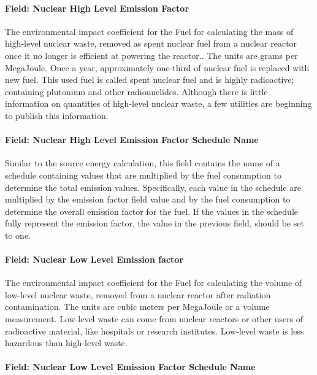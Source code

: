 \paragraph{Field: Nuclear High Level Emission Factor}\label{field-nuclear-high-level-emission-factor}

The environmental impact coefficient for the Fuel for calculating the mass of high-level nuclear waste, removed as spent nuclear fuel from a nuclear reactor once it no longer is efficient at powering the reactor.. The units are grams per MegaJoule. Once a year, approximately one-third of nuclear fuel is replaced with new fuel. This used fuel is called spent nuclear fuel and is highly radioactive; containing plutonium and other radionuclides. Although there is little information on quantities of high-level nuclear waste, a few utilities are beginning to publish this information.

\paragraph{Field: Nuclear High Level Emission Factor Schedule Name}\label{field-nuclear-high-level-emission-factor-schedule-name}

Similar to the source energy calculation, this field contains the name of a schedule containing values that are multiplied by the fuel consumption to determine the total emission values. Specifically, each value in the schedule are multiplied by the emission factor field value and by the fuel consumption to determine the overall emission factor for the fuel. If the values in the schedule fully represent the emission factor, the value in the previous field, should be set to one.

\paragraph{Field: Nuclear Low Level Emission factor}\label{field-nuclear-low-level-emission-factor}

The environmental impact coefficient for the Fuel for calculating the volume of low-level nuclear waste, removed from a nuclear reactor after radiation contamination. The units are cubic meters per MegaJoule or a volume measurement. Low-level waste can come from nuclear reactors or other users of radioactive material, like hospitals or research institutes. Low-level waste is less hazardous than high-level waste.

\paragraph{Field: Nuclear Low Level Emission Factor Schedule Name}\label{field-nuclear-low-level-emission-factor-schedule-name}

